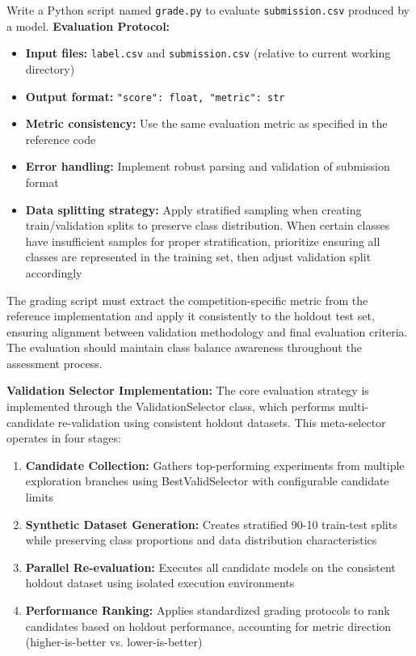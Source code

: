 \begin{tcolorbox}[
colback=gray!5,
colframe=gray!80,
title=Standardized Performance Grading --- Evaluation Strategy Component,
breakable
]
Write a Python script named \texttt{grade.py} to evaluate \texttt{submission.csv} produced by a model.
\textbf{Evaluation Protocol:}
\begin{itemize}
\item \textbf{Input files:} \texttt{label.csv} and \texttt{submission.csv} (relative to current working directory)
\item \textbf{Output format:} \texttt{{"score": float, "metric": str}}
\item \textbf{Metric consistency:} Use the same evaluation metric as specified in the reference code
\item \textbf{Error handling:} Implement robust parsing and validation of submission format
\item \textbf{Data splitting strategy:} Apply stratified sampling when creating train/validation splits to preserve class distribution. When certain classes have insufficient samples for proper stratification, prioritize ensuring all classes are represented in the training set, then adjust validation split accordingly
\end{itemize}
The grading script must extract the competition-specific metric from the reference implementation and apply it consistently to the holdout test set, ensuring alignment between validation methodology and final evaluation criteria. The evaluation should maintain class balance awareness throughout the assessment process.
\end{tcolorbox}

\textbf{Validation Selector Implementation:} The core evaluation strategy is implemented through the ValidationSelector class, which performs multi-candidate re-validation using consistent holdout datasets. This meta-selector operates in four stages:

\begin{enumerate}
    \item \textbf{Candidate Collection:} Gathers top-performing experiments from multiple exploration branches using BestValidSelector with configurable candidate limits
    \item \textbf{Synthetic Dataset Generation:} Creates stratified 90-10 train-test splits while preserving class proportions and data distribution characteristics
    \item \textbf{Parallel Re-evaluation:} Executes all candidate models on the consistent holdout dataset using isolated execution environments
    \item \textbf{Performance Ranking:} Applies standardized grading protocols to rank candidates based on holdout performance, accounting for metric direction (higher-is-better vs. lower-is-better)
\end{enumerate}

